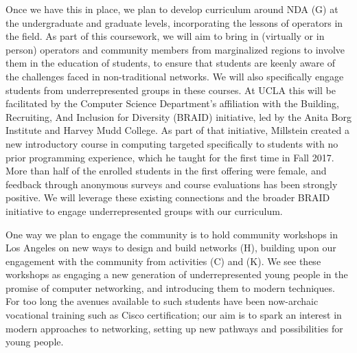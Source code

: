 \documentclass[10pt]{article}
\begin{document}
Once we have this in place, we plan to develop curriculum around NDA (G) at the undergraduate and graduate levels, incorporating the lessons of operators in the field.  As part of this coursework, we will aim to bring in (virtually or in person) operators and community members from marginalized regions to involve them in the education of students, to ensure that students are keenly aware of the challenges faced in non-traditional networks.   We will also specifically engage students from underrepresented groups in these courses.  At UCLA this will be facilitated by the Computer Science Department's affiliation with the Building, Recruiting, And Inclusion for Diversity (BRAID) initiative, led by the Anita Borg Institute and Harvey Mudd College. As part of that initiative, Millstein 
created a new introductory course in computing targeted specifically to students with no prior programming experience, which he taught for the first time in Fall 2017.  More than half of the enrolled students in the first offering were female, and feedback through anonymous surveys and course evaluations has been strongly positive.  We will leverage these existing connections and the broader BRAID initiative to engage underrepresented groups with our curriculum.

One way we plan to engage the community is to hold community workshops in Los Angeles on new ways to design and build networks (H), building upon our engagement with the community from activities (C) and (K).  We see these workshops as engaging a new generation of underrepresented young people in the promise of computer networking, and introducing them to modern techniques.  For too long the avenues available to such students have been now-archaic vocational training such as Cisco certification; our aim is to spark an interest in modern approaches to networking, setting up new pathways and possibilities for young people.
\end{document}
